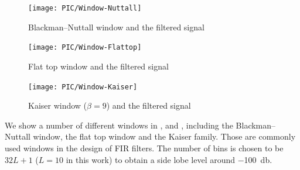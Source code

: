 \begin{figure}[htb!]
\centering
\texttt{[image: PIC/Window-Nuttall]}
\caption{Blackman--Nuttall window and the filtered signal}\label{fig:nuttall_window}
\end{figure}
\begin{figure}[htb!]
\centering
\texttt{[image: PIC/Window-Flattop]}
\caption{Flat top window and the filtered signal}\label{fig:flattop_window}
\end{figure}
\begin{figure}[htb!]
\centering
\texttt{[image: PIC/Window-Kaiser]}
\caption{Kaiser window ($\beta=9$) and the filtered signal}\label{fig:kaiser_window}
\end{figure}
We show a number of different windows in ,  and , including the Blackman--Nuttall window, the flat top window and the Kaiser family. Those are commonly used windows \citep{Oppenheim2010} in the design of FIR filters. The number of bins is chosen to be $32L+1$ ($L=10$ in this work) to obtain a side lobe level around \SI{-100}{\decibel}.

